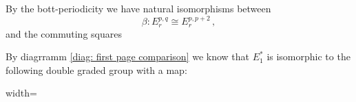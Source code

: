 	\begin{corollary} 
		By the bott-periodicity we have natural isomorphisms between 
		\begin{equation*}
			\beta:	E^{p,q}_r\cong E^{p,p+2}_r\,,
		\end{equation*} and the commuting squares
		\begin{center}
		\end{center}
		By diagrramm \ref{diag: first page comparison} we know that $E_1^{*}$ is isomorphic to the following double graded group with a map: 
		\begin{center}
			\begin{framed}
				\begin{adjustbox}{width=\textwidth}
\end{adjustbox}
\end{framed}
\end{center}
\end{corollary}
